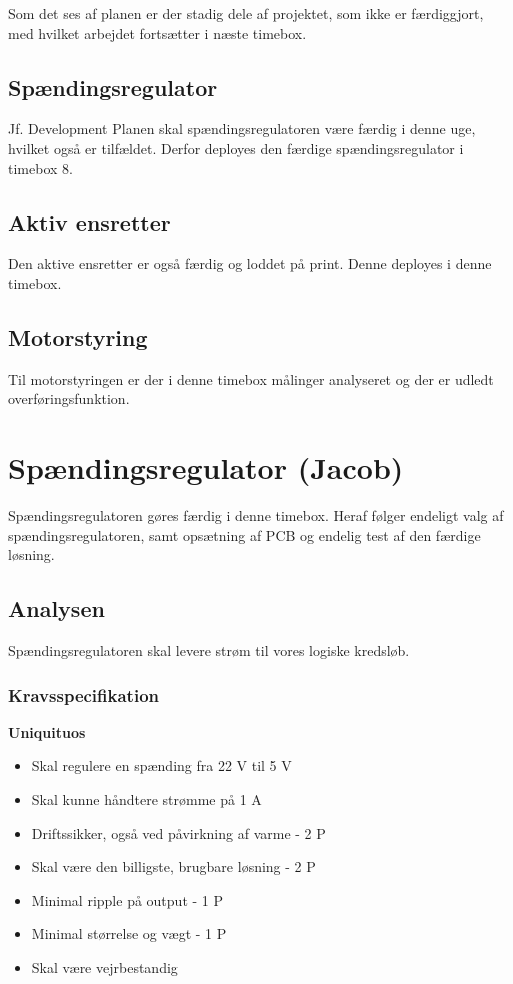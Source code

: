 Som det ses af planen er der stadig dele af projektet, som ikke er færdiggjort, med hvilket arbejdet fortsætter i næste timebox.

\subsection{Spændingsregulator}
\label{sec:spandingsregulator}
Jf. Development Planen skal spændingsregulatoren være færdig i denne uge, hvilket også er tilfældet. Derfor deployes den færdige spændingsregulator i timebox 8. 

\subsection{Aktiv ensretter}
\label{sec:aktiv-ensretter}
Den aktive ensretter er også færdig og loddet på print. Denne deployes i denne timebox. 

\subsection{Motorstyring}
\label{sec:motorstyring}
Til motorstyringen er der i denne timebox målinger analyseret og der er udledt overføringsfunktion.
\clearpage
\section{Spændingsregulator (Jacob)}
\label{sec:spandingsregulator-1}

Spændingsregulatoren gøres færdig i denne timebox. Heraf følger endeligt valg af spændingsregulatoren, samt opsætning af PCB og endelig test af den færdige løsning.

\subsection{Analysen}
\label{sec:analysen}

Spændingsregulatoren skal levere strøm til vores logiske kredsløb.

\subsubsection{Kravsspecifikation}
\label{sec:kravsspecifikation}

\textbf{Uniquituos}
\begin{itemize}
\item Skal regulere en spænding fra 22 V til 5 V 
\item Skal kunne håndtere strømme på 1 A 
\item Driftssikker, også ved påvirkning af varme - 2 P
\item Skal være den billigste, brugbare løsning - 2 P
\item Minimal ripple på output - 1 P
\item Minimal størrelse og vægt - 1 P
\item Skal være vejrbestandig 
\end{itemize}

